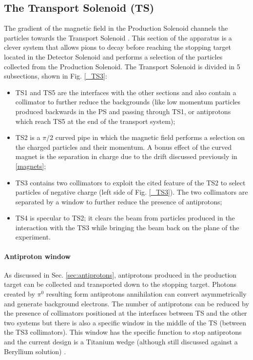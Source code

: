 \documentclass[12pt,a4paper,openright, oneside, titlepage]{book} %
\begin{document}
\subsection{The Transport Solenoid (TS)}
The gradient of the magnetic field in the Production Solenoid channels the particles towards the Transport Solenoid \cite{TS}. 
This section of the apparatus is a clever system that allows pions to decay before reaching the stopping target 
located in the Detector Solenoid
and performs a selection of the particles collected from the Production Solenoid. 
The Transport Solenoid is divided in 5 subsections, shown in Fig. \ref{_TS3}:
\begin{itemize}
\item TS1 and TS5 are the interfaces with the other sections and also contain a collimator to further reduce the backgrounds (like low momentum particles produced backwards in the PS and passing through TS1, or antiprotons which reach TS5 at the end of the transport system);
\item TS2 is a $\pi/2$ curved pipe in which the magnetic field performs a selection on the charged particles and their momentum. A bonus effect of the curved magnet is the separation in charge due to the drift discussed previously in \ref{magnets}; 
\item TS3 contains two collimators to exploit the cited feature of the TS2 to select particles of negative charge (left side of Fig. \ref{_TS3}). 
The two collimators are separated by a window to further reduce the presence of antiprotons;
\item TS4 is specular to TS2; it clears the beam from particles produced in the interaction with the TS3 while bringing the beam back on the plane of the experiment.
\end{itemize}

\paragraph{Antiproton window} As discussed in Sec. \ref{sec:antiprotons}, antiprotons produced in the production target can be collected and transported down to the stopping target. 
Photons created by $\pi^0$ resulting form antiprotons annihilation can convert asymmetrically and generate background electrons. 
The number of antiprotons can be reduced by the presence of collimators positioned at the interfaces between TS and the other two systems but there is also a specific window in the middle of the TS (between the TS3 collimators). 
This window has the specific function to stop antiprotons and the current design is a Titanium wedge (although still discussed against a Beryllium solution) \cite{PbarWindow}.
\end{document}
